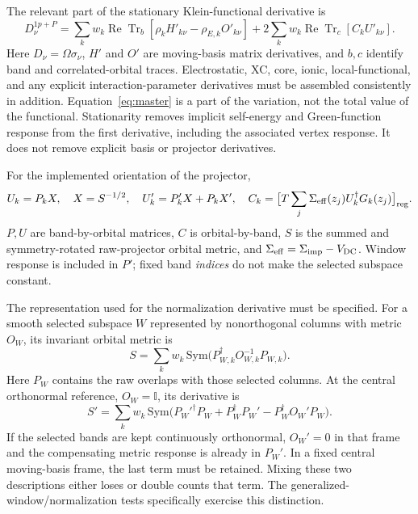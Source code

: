 \documentclass[11pt]{article}
\newcommand{\Tr}{\operatorname{Tr}}
\newcommand{\Rea}{\operatorname{Re}}
\newcommand{\Id}{\mathbb I}
\begin{document}
The relevant part of the stationary Klein-functional derivative is
\begin{equation}\label{eq:master}
 \boxed{D_\nu^{1p+P}=\sum_k w_k\Rea\Tr_b[\rho_k H'_{k\nu}-\rho_{E,k}O'_{k\nu}]
       +2\sum_k w_k\Rea\Tr_c[C_k U'_{k\nu}].}
\end{equation}
Here $D_\nu=\Omega\sigma_\nu$, $H'$ and $O'$ are moving-basis matrix derivatives, and $b,c$ identify band and correlated-orbital traces. Electrostatic, XC, core, ionic, local-functional, and any explicit interaction-parameter derivatives must be assembled consistently in addition. Equation~\eqref{eq:master} is a part of the variation, not the total value of the functional. Stationarity removes implicit self-energy and Green-function response from the first derivative, including the associated vertex response. It does not remove explicit basis or projector derivatives.

For the implemented orientation of the projector,
\begin{equation}
 U_k=P_kX,\quad X=S^{-1/2},\quad
 U'_k=P'_kX+P_kX',\quad
 C_k=\big[T\sum_j\Sigma_{\rm eff}(z_j)U_k^\dagger G_k(z_j)\big]_{\rm reg}.
\end{equation}
$P,U$ are band-by-orbital matrices, $C$ is orbital-by-band, $S$ is the summed and symmetry-rotated raw-projector orbital metric, and $\Sigma_{\rm eff}=\Sigma_{\rm imp}-V_{\rm DC}$. Window response is included in $P'$; fixed band \emph{indices} do not make the selected subspace constant.

The representation used for the normalization derivative must be specified. For a smooth selected subspace $W$ represented by nonorthogonal columns with metric $O_W$, its invariant orbital metric is
\begin{equation}
 S=\sum_k w_k\,\mathrm{Sym}\big(P_{W,k}^\dagger O_{W,k}^{-1}P_{W,k}\big).
\end{equation}
Here $P_W$ contains the raw overlaps with those selected columns. At the central orthonormal reference, $O_W=\Id$, its derivative is
\begin{equation}\label{eq:normmetric}
 S'=\sum_k w_k\,\mathrm{Sym}\big(P_W'^\dagger P_W+P_W^\dagger P_W'
                    -P_W^\dagger O_W'P_W\big).
\end{equation}
If the selected bands are kept continuously orthonormal, $O_W'=0$ in that frame and the compensating metric response is already in $P_W'$. In a fixed central moving-basis frame, the last term must be retained. Mixing these two descriptions either loses or double counts that term. The generalized-window/normalization tests specifically exercise this distinction.
\end{document}
